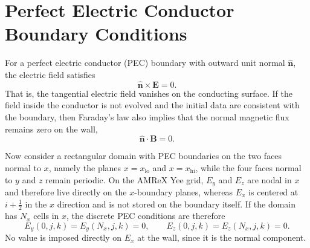 \documentclass{article}
\numberwithin{equation}{section}
\numberwithin{figure}{section}
\begin{document}
\section{Perfect Electric Conductor Boundary Conditions}
\label{sec:pec-boundary-conditions}

For a perfect electric conductor (PEC) boundary with outward unit normal $\hat{\mathbf{n}}$, the electric field satisfies
\begin{equation}
    \hat{\mathbf{n}} \times \mathbf{E} = 0.
\end{equation}
That is, the tangential electric field vanishes on the conducting surface. If the field inside the conductor is not evolved and the initial data are consistent with the boundary, then Faraday's law also implies that the normal magnetic flux remains zero on the wall,
\begin{equation}
    \hat{\mathbf{n}} \cdot \mathbf{B} = 0.
\end{equation}

Now consider a rectangular domain with PEC boundaries on the two faces normal to $x$, namely the planes $x=x_{\mathrm{lo}}$ and $x=x_{\mathrm{hi}}$, while the four faces normal to $y$ and $z$ remain periodic. On the AMReX Yee grid, $E_y$ and $E_z$ are nodal in $x$ and therefore live directly on the $x$-boundary planes, whereas $E_x$ is centered at $i+\tfrac12$ in the $x$ direction and is not stored on the boundary itself. If the domain has $N_x$ cells in $x$, the discrete PEC conditions are therefore
\begin{equation}\label{eq:pec-x-walls}
    E_y(0,j,k) = E_y(N_x,j,k) = 0, \qquad E_z(0,j,k) = E_z(N_x,j,k) = 0.
\end{equation}
No value is imposed directly on $E_x$ at the wall, since it is the normal component.
\end{document}
